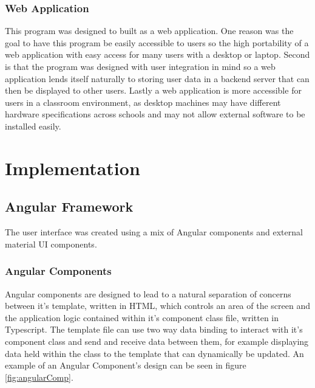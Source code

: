\documentclass{l4proj}
\begin{document}
\subsection{Web Application}
This program was designed to built as a web application. One reason was the goal to have this program be easily accessible to users so the high portability of a web application with easy access for many users with a desktop or laptop. Second is that the program was designed with user integration in mind so a web application lends itself naturally to storing user data in a backend server that can then be displayed to other users. Lastly a web application is more accessible for users in a classroom environment, as desktop machines may have different hardware specifications across schools and may not allow external software to be installed easily.


\chapter{Implementation}
\section{Angular Framework}
The user interface was created using a mix of Angular components and external material UI components.
\subsection{Angular Components}
Angular components are designed to lead to a natural separation of concerns between it's template, written in HTML, which controls an area of the screen and the application logic contained within it's component class file, written in Typescript. The template file can use two way data binding to interact with it's component class and send and receive data between them, for example displaying data held within the class to the template that can dynamically be updated. An example of an Angular Component's design can be seen in figure \ref{fig:angularComp}.
\end{document}
